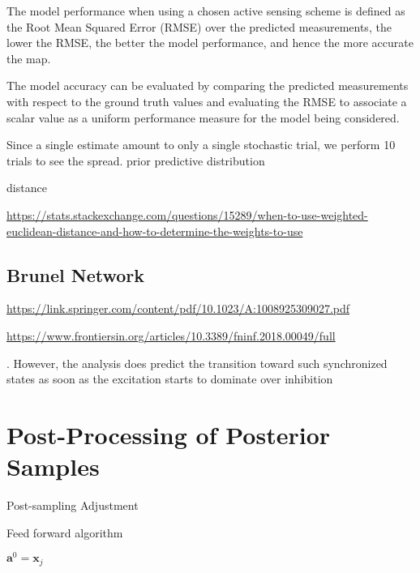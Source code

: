 The model performance when using a chosen active sensing scheme is defined as the Root Mean Squared Error (RMSE) over the predicted measurements, the lower the RMSE, the better the model performance, and hence the more accurate the map.

The model accuracy can be evaluated by comparing the predicted measurements with respect to the ground truth values and evaluating the RMSE to associate a scalar value as a uniform performance measure for the model being considered.


Since a single estimate amount to only a single stochastic trial, we perform 10 trials to see the spread. prior predictive distribution 


distance 

\url{https://stats.stackexchange.com/questions/15289/when-to-use-weighted-euclidean-distance-and-how-to-determine-the-weights-to-use}


\subsection{Brunel Network}

\url{https://link.springer.com/content/pdf/10.1023/A:1008925309027.pdf}

\url{https://www.frontiersin.org/articles/10.3389/fninf.2018.00049/full}

. However, the analysis does predict the transition
toward such synchronized states as soon as the excitation starts to dominate over inhibition

\section{Post-Processing of Posterior Samples}\label{sec:post_processing}

Post-sampling Adjustment

\begin{algorithm}[H]
\caption{Feed forward algorithm}
\label{alg:FeedForward}
\begin{algorithmic}[1] 

        \State $\mathbf{a}^0 = \mathbf{x}_j$\;
\EndFor

\end{algorithmic}
\end{algorithm}

